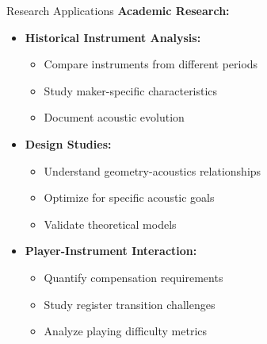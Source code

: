 \documentclass[aspectratio=169,10pt]{beamer}
\begin{document}
\begin{frame}{Research Applications}
\textbf{Academic Research:}

\begin{itemize}
    \item \textbf{Historical Instrument Analysis:}
    \begin{itemize}
        \item Compare instruments from different periods
        \item Study maker-specific characteristics
        \item Document acoustic evolution
    \end{itemize}
    
    \item \textbf{Design Studies:}
    \begin{itemize}
        \item Understand geometry-acoustics relationships
        \item Optimize for specific acoustic goals
        \item Validate theoretical models
    \end{itemize}
    
    \item \textbf{Player-Instrument Interaction:}
    \begin{itemize}
        \item Quantify compensation requirements
        \item Study register transition challenges
        \item Analyze playing difficulty metrics
    \end{itemize}
\end{itemize}
\end{frame}
\end{document}
